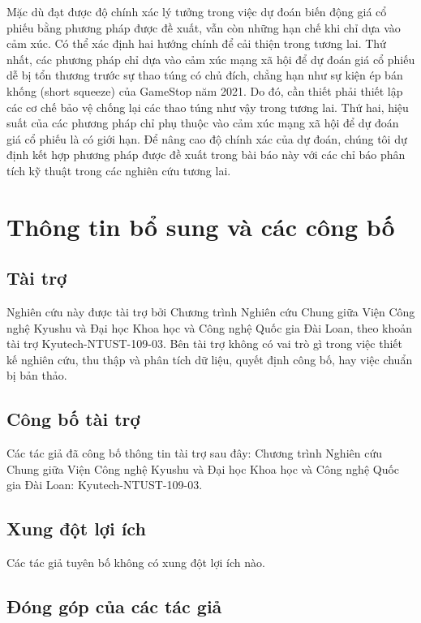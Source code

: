 Mặc dù đạt được độ chính xác lý tưởng trong việc dự đoán biến động giá cổ phiếu bằng phương pháp được đề xuất, vẫn còn những hạn chế khi chỉ dựa vào cảm xúc. Có thể xác định hai hướng chính để cải thiện trong tương lai. Thứ nhất, các phương pháp chỉ dựa vào cảm xúc mạng xã hội để dự đoán giá cổ phiếu dễ bị tổn thương trước sự thao túng có chủ đích, chẳng hạn như sự kiện ép bán khống (short squeeze) của GameStop năm 2021. Do đó, cần thiết phải thiết lập các cơ chế bảo vệ chống lại các thao túng như vậy trong tương lai. Thứ hai, hiệu suất của các phương pháp chỉ phụ thuộc vào cảm xúc mạng xã hội để dự đoán giá cổ phiếu là có giới hạn. Để nâng cao độ chính xác của dự đoán, chúng tôi dự định kết hợp phương pháp được đề xuất trong bài báo này với các chỉ báo phân tích kỹ thuật trong các nghiên cứu tương lai.

\section{Thông tin bổ sung và các công bố}

\subsection*{Tài trợ}

Nghiên cứu này được tài trợ bởi Chương trình Nghiên cứu Chung giữa Viện Công nghệ Kyushu và Đại học Khoa học và Công nghệ Quốc gia Đài Loan, theo khoản tài trợ Kyutech-NTUST-109-03. Bên tài trợ không có vai trò gì trong việc thiết kế nghiên cứu, thu thập và phân tích dữ liệu, quyết định công bố, hay việc chuẩn bị bản thảo.

\subsection*{Công bố tài trợ}

Các tác giả đã công bố thông tin tài trợ sau đây: Chương trình Nghiên cứu Chung giữa Viện Công nghệ Kyushu và Đại học Khoa học và Công nghệ Quốc gia Đài Loan: Kyutech-NTUST-109-03.

\subsection*{Xung đột lợi ích}

Các tác giả tuyên bố không có xung đột lợi ích nào.

\subsection*{Đóng góp của các tác giả}

